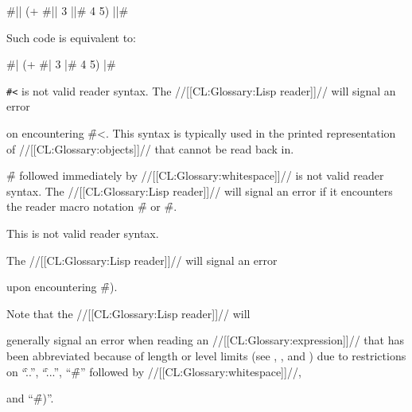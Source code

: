 \code
 #|| (+ #|| 3 ||# 4 5) ||# 
\endcode

Such code is equivalent to:

\code
 #| (+ #| 3 |# 4 5) |#
\endcode

\endsubsubsubsection%

\endsubsubsection%




{\tt  \#<} is not valid reader syntax.
The //[[CL:Glossary:Lisp reader]]// will signal an error 

on encountering \f{\#<}.
This syntax is typically used in the printed representation 
of //[[CL:Glossary:objects]]// that cannot be read back in.  

\endsubsubsection%







\f{\#} followed immediately by //[[CL:Glossary:whitespace]]// is not valid reader syntax.
The //[[CL:Glossary:Lisp reader]]// will signal an error  if it
encounters the reader macro notation \f{\#\NewlineChar} or \f{\#\SpaceChar}.

\endsubsubsection%




This is not valid reader syntax.


The //[[CL:Glossary:Lisp reader]]// will signal an error 


upon encountering \f{\#)}.

\endsubsubsection%

\endsubsection%



Note that the //[[CL:Glossary:Lisp reader]]// will 

generally
signal an error 
when reading an //[[CL:Glossary:expression]]// that has been
abbreviated because of length or level limits 
(see ,
     ,
 and )
due to restrictions on ``\f{..}'', ``\f{...}'', ``\f{\#}'' followed by //[[CL:Glossary:whitespace]]//,

and ``\f{\#)}''.

\endsubsection%
